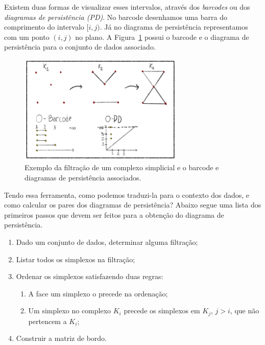 Existem duas formas de visualizar esses intervalos, através dos
\textit{barcodes} ou dos \textit{diagramas de persistência (PD)}. No barcode
desenhamos uma barra do comprimento do intervalo $[i,j)$. Já no diagrama de
persistência representamos com um ponto $(i,j)$ no plano. A Figura~\ref{fig:ex_ciclos}
possui o barcode e o diagrama de persistência para o conjunto de dados associado.

\begin{figure}[!htpb]
  \centering
  \includegraphics[width=0.7\textwidth]{images/filt_bar_pd.png}
  \caption{Exemplo da filtração de um complexo simplicial e o barcode e diagramas
  de persistência associados.}
  \label{fig:ex_ciclos}
  \fautor
\end{figure}

Tendo essa ferramenta, como podemos traduzi-la para o contexto dos dados, e
como calcular os pares dos diagramas de persistência? Abaixo segue uma lista
dos primeiros passos que devem ser feitos para a obtenção do diagrama de persistência.

\begin{enumerate}
  \item Dado um conjunto de dados, determinar alguma filtração;
  \item Listar todos os simplexos na filtração;
  \item Ordenar os simplexos satisfazendo duas regras:
  \begin{enumerate}
    \item A face um simplexo o precede na ordenação;
    \item Um simplexo no complexo $K_i$ precede os simplexos em $K_j$, $j > i$,
    que não pertencem a $K_i$;
  \end{enumerate}
  \item Construir a matriz de bordo.
\end{enumerate}

